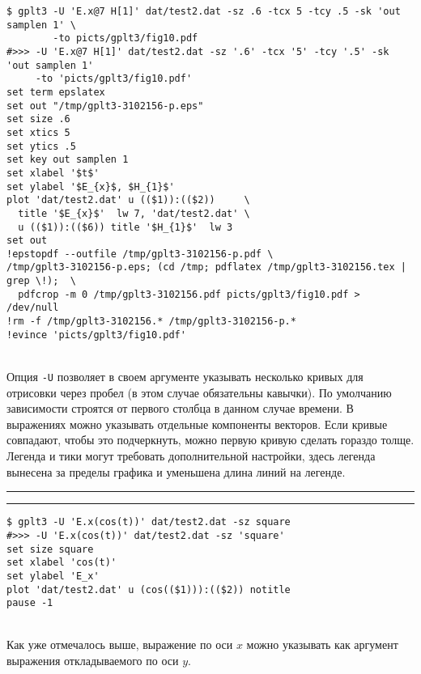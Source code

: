 \documentclass[12pt]{article}
\begin{document}
\vspace{3mm}
\noindent
\begin{minipage}[b]{.48\textwidth}
\small
\begin{verbatim}
$ gplt3 -U 'E.x@7 H[1]' dat/test2.dat -sz .6 -tcx 5 -tcy .5 -sk 'out samplen 1' \
        -to picts/gplt3/fig10.pdf
#>>> -U 'E.x@7 H[1]' dat/test2.dat -sz '.6' -tcx '5' -tcy '.5' -sk 'out samplen 1' 
     -to 'picts/gplt3/fig10.pdf'
set term epslatex 
set out "/tmp/gplt3-3102156-p.eps"
set size .6
set xtics 5
set ytics .5
set key out samplen 1
set xlabel '$t$'
set ylabel '$E_{x}$, $H_{1}$'
plot 'dat/test2.dat' u (($1)):(($2))     \
  title '$E_{x}$'  lw 7, 'dat/test2.dat' \
  u (($1)):(($6)) title '$H_{1}$'  lw 3 
set out
!epstopdf --outfile /tmp/gplt3-3102156-p.pdf \
/tmp/gplt3-3102156-p.eps; (cd /tmp; pdflatex /tmp/gplt3-3102156.tex | grep \!);  \
  pdfcrop -m 0 /tmp/gplt3-3102156.pdf picts/gplt3/fig10.pdf > /dev/null
!rm -f /tmp/gplt3-3102156.* /tmp/gplt3-3102156-p.*
!evince 'picts/gplt3/fig10.pdf'
\end{verbatim}
\end{minipage}
\raisebox{2cm}{\epsfig{file=picts/gplt3/fig10, width=.5\textwidth}}\\[5mm]
Опция \verb'-U' позволяет в своем аргументе указывать несколько кривых для отрисовки через пробел (в этом случае обязательны кавычки).
По умолчанию зависимости строятся от первого столбца в данном случае времени. В выражениях можно указывать отдельные компоненты векторов.
Если кривые совпадают, чтобы это подчеркнуть, можно первую кривую сделать гораздо толще.
Легенда и тики могут требовать дополнительной настройки, здесь легенда вынесена за пределы графика и уменьшена длина линий на легенде.\\

\newpage
\noindent\rule{.45\textwidth}{1pt}\hfill \raisebox{-.45\height}{\bf № 8.}  \hfill\rule{.45\textwidth}{1pt}

\vspace{3mm}
\noindent
\begin{minipage}[b]{.73\textwidth}
\small
\begin{verbatim}
$ gplt3 -U 'E.x(cos(t))' dat/test2.dat -sz square
#>>> -U 'E.x(cos(t))' dat/test2.dat -sz 'square'
set size square
set xlabel 'cos(t)'
set ylabel 'E_x'
plot 'dat/test2.dat' u (cos(($1))):(($2)) notitle   
pause -1
\end{verbatim}
\end{minipage}
\\[5mm]
Как уже отмечалось выше, выражение по оси $x$  можно указывать как аргумент выражения откладываемого по оси $y$.
\end{document}
